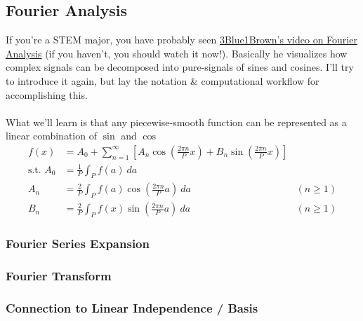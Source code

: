\documentclass[12pt,fleqn]{article}
\numberwithin{equation}{section} %
\begin{document}
\subsection{Fourier Analysis}
If you're a STEM major, you have probably seen \href{https://www.youtube.com/watch?v=spUNpyF58BY}
{3Blue1Brown's video on Fourier Analysis} (if you haven't, you should watch it now!). Basically he visualizes how complex signals can be decomposed into pure-signals of sines and cosines. I'll try to introduce it again, but lay the notation \& computational workflow for accomplishing this.\\
\\
What we'll learn is that any piecewise-smooth function can be represented as a linear combination of $\sin$ and $\cos$
\begin{align}
	f(x) & = A_0 + \sum_{n=1}^\infty \left [ A_n \cos \left( \tfrac{2\pi n}{P} x \right) + B_n \sin (\tfrac{2\pi n}{P} x) \right]\\
	\text{s.t. } A_0 & = \frac{1}{P} \int_{P} f(a)~ da\\
	A_n & = \frac{2}{P} \int_P f(a) \cos \left( \tfrac{2\pi n}{P} a \right) ~da & (n \geq 1)\\
	B_n & = \frac{2}{P} \int_P f(x) \sin \left( \tfrac{2\pi n}{P} a \right) ~da & (n \geq 1)
\end{align}

\subsubsection{Fourier Series Expansion}



\subsubsection{Fourier Transform}

\subsubsection{Connection to Linear Independence / Basis}
\end{document}
